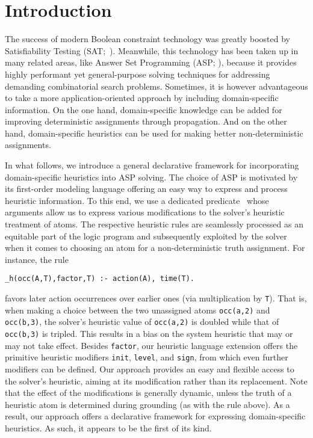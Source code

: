 
\section{Introduction}\label{sec:introduction}

The success of modern Boolean constraint technology was greatly boosted by Satisfiability Testing
(SAT;~\cite{SATHandbook}).
Meanwhile, this technology has been taken up in many related areas, 
like
Answer Set Programming (ASP; \cite{baral02a}),
because it provides highly performant yet general-purpose solving techniques for addressing demanding combinatorial search problems.
%
Sometimes, it is however advantageous to take a more application-oriented approach
by including domain-specific information.
On the one hand, domain-specific knowledge can be added for improving deterministic assignments
through propagation.
And on the other hand, domain-specific heuristics can be used for making better non-deterministic assignments.

In what follows,
we introduce a general declarative framework for incorporating domain-specific heuristics into ASP solving.
The choice of ASP is motivated by its first-order modeling language offering an easy way to express and process
heuristic information.
To this end,
we use a dedicated predicate \hpredicate\
whose arguments allow us to express various modifications to the solver's heuristic treatment of atoms.
The respective heuristic rules are seamlessly processed as an equitable part of the logic program
and subsequently exploited by the solver when it comes to choosing an atom for a non-deterministic 
truth assignment.
%
For instance, the rule
\begin{lstlisting}
_h(occ(A,T),factor,T) :- action(A), time(T).
\end{lstlisting}
favors later action occurrences over earlier ones (via multiplication by \texttt{T}).
That is, when making a choice between the two unassigned atoms \texttt{occ(a,2)} and \texttt{occ(b,3)},
the solver's heuristic value of \texttt{occ(a,2)} is doubled while that of \texttt{occ(b,3)} is tripled.
This results in a bias on the system heuristic that may or may not take effect.
%
Besides \texttt{factor}, our heuristic language extension offers the primitive heuristic modifiers
\texttt{init}, \texttt{level}, and \texttt{sign}, from which even further modifiers can be defined.
Our approach provides an easy and flexible access to the solver's heuristic,
aiming at its modification rather than its replacement.
Note that the effect of the modifications is generally dynamic,
unless the truth of a heuristic atom is determined during grounding (as with the rule above).
As a result, our approach offers a declarative framework for expressing domain-specific heuristics. %
As such, it appears to be the first of its kind.

